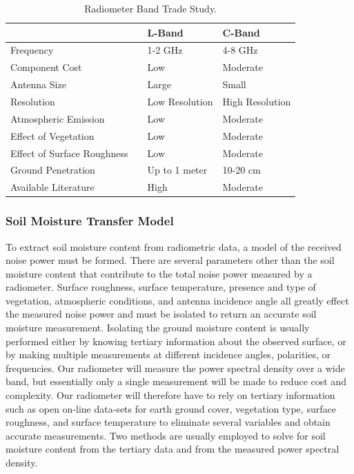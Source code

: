 \documentclass[12pt]{article}
\begin{document}
\begin{table}[!h]
	\centering
	\vspace{0.5cm}
	\renewcommand{\arraystretch}{1.3}
	\caption{Radiometer Band Trade Study. }
	\label{tab:band_trade}
	\begin{tabularx}{\textwidth}{lXll}
		\toprule
									& & L-Band & C-Band \\		
		\midrule
		Frequency					& &1-2 GHz&4-8 GHz \\ 
		Component Cost				& &Low&Moderate	 \\
		Antenna Size 				& &Large&Small	 \\
		Resolution 					& &Low Resolution&High Resolution 	\\ 
		Atmospheric Emission		& &Low&Moderate 					\\ 
		Effect of Vegetation		& &Low&Moderate						\\
		Effect of Surface Roughness	& &Low&Moderate						\\
		Ground Penetration			& &Up to 1 meter&10-20 cm			\\
		Available Literature 		& &High&Moderate	
	\end{tabularx}
\end{table}

\subsubsection{Soil Moisture Transfer Model}

To extract soil moisture content from radiometric data, a model of the received noise power must be formed. There are several parameters other than the soil moisture content that contribute to the total noise power measured by a radiometer. Surface roughness, surface temperature, presence and type of vegetation, atmospheric conditions, and antenna incidence angle all greatly effect the measured noise power and must be isolated to return an accurate soil moisture measurement. Isolating the ground moisture content is usually performed either by knowing tertiary information about the observed surface, or by making multiple measurements at different incidence angles, polarities, or frequencies. Our radiometer will measure the power spectral density over a wide band, but essentially only a single measurement will be made to reduce cost and complexity. Our radiometer will therefore have to rely on tertiary information such as open on-line data-sets for earth ground cover, vegetation type, surface roughness, and surface temperature to eliminate several variables and obtain accurate measurements. Two methods are usually employed to solve for soil moisture content from the tertiary data and from the measured power spectral density.
\end{document}
